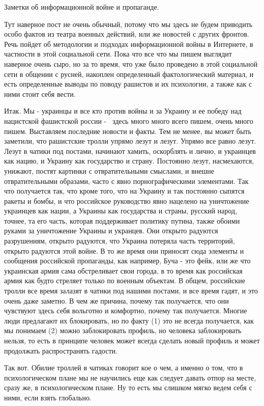  
 
 
 
 

Заметки об информационной войне и пропаганде.

Тут наверное пост не очень обычный, потому что мы здесь не будем приводить
особо фактов из театра военных действий, или же новостей с других фронтов. Речь
пойдет об методологии и подходах информационной войны в Интернете, в частности
в этой социальной сети. Пока что все что мы пишем выглядит наверное очень сыро,
но за то время, что уже было проведено в этой социальной сети в общении с
русней, накоплен определенный фактологический материал, и есть определенные
выводы по поводу рашистов и их психологии, а также как с ними стоит себя
вести.

Итак. Мы - украинцы и все кто против войны и за Украину и ее победу над
нацистской фашистской россии -  здесь много много всего пишем, очень много
пишем. Выставляем последние новости и факты. Тем не менее, вы может быть
заметили, что рашистские тролли упрямо лезут и лезут. Упрямо
все равно лезут. Лезут в чатики под постами, начинают хамить, оскорблять и
лично, и украинцев как нацию, и Украину как государство и страну. Постоянно
лезут, насмехаются, унижают, постят картинки с отвратительными смыслами, и
внешне отвратительными образами, часто с явно порнографическими элементами. Так
что получается так, что кроме того, что на Украину и так постоянно сыпятся
ракеты и бомбы, и что российское руководство явно нацелено на уничтожение
украинцев как нации, а Украины как государства и страны, русский народ, точнее,
та его часть, которая поддерживает политику путина, также обоими руками за
уничтожение Украины и укранцев. Они открыто радуются разрушениям, открыто
радуются, что Украина потеряла часть территорий, открыто радуются этой войне. В
то же время они приносят сюда элементы и сообщения российской пропаганды, как
например, Буча - это фейк, или же что украинская армия сама обстреливает свои
города, в то время как российская армия как будто стреляет только по военным
объектам. В общем, российские тролли все время залазят в чатики под нашими
постами, и все время гадят, и это очень даже заметно. В чем же причина, почему
так получается, что они чувствуют здесь себя вольготно и комфортно, почему так
получается. Многие люди предлагают их блокировать, но по факту (1) это не
всегда получается, как мы понимаем (2) можно заблокировать профиль, но человека
заблокировать нельзя, то есть в принципе человек может всегда сделать новый
профиль и может продолжать распространять гадости. 

Так вот. Обилие троллей в чатиках говорит кое о чем, а именно о том, что в
психологическом плане мы не научились еще как следует давать отпор на месте,
сразу же, в психологическом плане. Ну то есть мы слишком мягко ведем себя с
ними, если взять глобально. 
